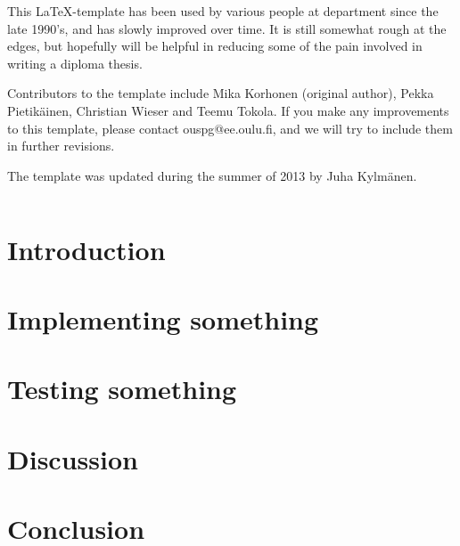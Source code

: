 \documentclass[a4paper, 12pt,titlepage]{dithesis}
\begin{document}

\sisluettelo

This \LaTeX -template has been used by various people at department
since the late 1990's, and has slowly improved over time.  It is still
somewhat rough at the edges, but hopefully will be helpful in reducing
some of the pain involved in writing a diploma thesis.

Contributors to the template include Mika Korhonen (original author),
Pekka Pietikäinen, Christian Wieser and Teemu Tokola.  If you make any
improvements to this template, please contact ouspg@ee.oulu.fi, and we
will try to include them in further revisions.

The template was updated during the summer of 2013 by Juha Kylmänen.


\setlongtables
\begin{longtable}[l]{p{3cm}p{}}



\end{longtable}
\setcounter{table}{0}

\chapter{Introduction}
\sivunumerot

\chapter{Implementing something}

\chapter{Testing something}

\chapter{Discussion}

\chapter{Conclusion}



\end{document}
